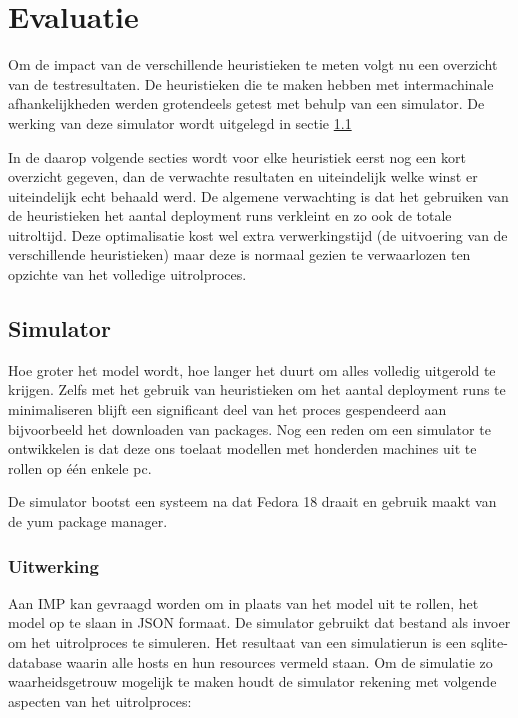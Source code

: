 
\chapter{Evaluatie}
Om de impact van de verschillende heuristieken te meten volgt nu een overzicht van de testresultaten.
De heuristieken die te maken hebben met intermachinale afhankelijkheden werden grotendeels getest met behulp van een simulator.
De werking van deze simulator wordt uitgelegd in sectie \ref{sec:simulator}

In de daarop volgende secties wordt voor elke heuristiek eerst nog een kort overzicht gegeven, dan de verwachte resultaten en uiteindelijk welke winst er uiteindelijk echt behaald werd.
De algemene verwachting is dat het gebruiken van de heuristieken het aantal deployment runs verkleint en zo ook de totale uitroltijd.
Deze optimalisatie kost wel extra verwerkingstijd (de uitvoering van de verschillende heuristieken) maar deze is normaal gezien te verwaarlozen ten
opzichte van het volledige uitrolproces. 

\section{Simulator}
\label{sec:simulator}

Hoe groter het model wordt, hoe langer het duurt om alles volledig uitgerold te krijgen. 
Zelfs met het gebruik van heuristieken om het aantal deployment runs te minimaliseren blijft een significant deel van het proces gespendeerd aan bijvoorbeeld het downloaden van packages. 
Nog een reden om een simulator te ontwikkelen is dat deze ons toelaat modellen met honderden machines uit te rollen op \'e\'en enkele pc.

De simulator bootst een systeem na dat Fedora 18 draait en gebruik maakt van de yum package manager.

\subsection{Uitwerking}
\label{simulator:uitwerking}
Aan IMP kan gevraagd worden om in plaats van het model uit te rollen, het model op te slaan in JSON formaat.
De simulator gebruikt dat bestand als invoer om het uitrolproces te simuleren.
Het resultaat van een simulatierun is een sqlite-database waarin alle hosts en hun resources vermeld staan.
Om de simulatie zo waarheidsgetrouw mogelijk te maken houdt de simulator rekening met volgende aspecten van het uitrolproces:

